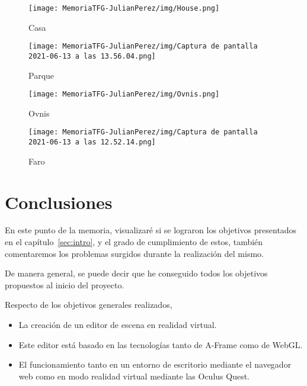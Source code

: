 \documentclass[a4paper, 12pt]{book}
\begin{document}
\begin{figure}[H]
  \centering
  \begin{minipage}[b]{0.4\textwidth}
 \texttt{[image: MemoriaTFG-JulianPerez/img/House.png]}
  \caption{Casa}\label{single}
  \end{minipage}
  \hfill
  \begin{minipage}[b]{0.4\textwidth}
  \texttt{[image: MemoriaTFG-JulianPerez/img/Captura de pantalla 2021-06-13 a las 13.56.04.png]}
  \caption{Parque}\label{scrum}
  \end{minipage}
\end{figure}
\begin{figure}[H]
  \centering
  \begin{minipage}[b]{0.4\textwidth}
 \texttt{[image: MemoriaTFG-JulianPerez/img/Ovnis.png]}
  \caption{Ovnis}\label{single}
  \end{minipage}
  \hfill
  \begin{minipage}[b]{0.4\textwidth}
  \texttt{[image: MemoriaTFG-JulianPerez/img/Captura de pantalla 2021-06-13 a las 12.52.14.png]}
  \caption{Faro}\label{scrum}
  \end{minipage}
\end{figure}
\cleardoublepage
\chapter{Conclusiones}
\label{chap:conclusiones}
En este punto de la memoria, visualizaré si se lograron los objetivos presentados en el capítulo~\ref{sec:intro}, y el grado de cumplimiento de estos, también comentaremos los problemas surgidos durante la realización del mismo.

De manera general, se puede decir que he conseguido todos los objetivos propuestos al inicio del proyecto.

Respecto de los objetivos generales realizados, 

\begin{itemize}
    \item La creación de un editor de escena en realidad virtual.
    \item Este editor está basado en las tecnologías tanto de A-Frame como de WebGL.
    \item El funcionamiento tanto en un entorno de escritorio mediante el navegador web como en modo realidad virtual mediante las Oculus Quest.
\end{itemize}
\end{document}
